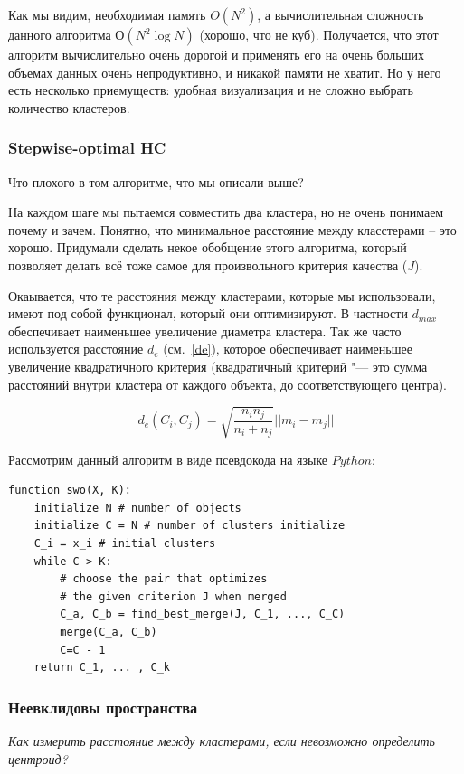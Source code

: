 Как мы видим, необходимая память $O(N^2)$, а вычислительная сложность данного алгоритма $О(N^2 \log N)$ (хорошо, что не куб). Получается, что этот алгоритм вычислительно очень дорогой и применять его на очень больших объемах данных очень непродуктивно, и никакой памяти не хватит. Но у него есть несколько приемуществ: удобная визуализация и не сложно выбрать количество кластеров.

\subsubsection{Stepwise-optimal HC}
Что плохого в том алгоритме, что мы описали выше?

На каждом шаге мы пытаемся совместить два кластера, но не очень понимаем почему и зачем. Понятно, что минимальное расстояние между класстерами -- это хорошо. Придумали сделать некое обобщение этого алгоритма, который позволяет делать всё тоже самое для произвольного критерия качества ($J$).

Окаывается, что те расстояния между кластерами, которые мы использовали, имеют под собой функционал, который они оптимизируют. В частности 
$d_{max}$ обеспечивает наименьшее увеличение диаметра кластера.
Так же часто используется расстояние
$d_e$ (см.~\ref{de}), которое обеспечивает наименьшее увеличение квадратичного критерия (квадратичный критерий "--- это сумма расстояний внутри кластера от каждого объекта, до соответствующего центра).

\begin{equation}\label{de}
d_e(C_i,C_j) = \sqrt{\frac{n_i n_j}{n_i+n_j}}||m_i - m_j||
\end{equation}

Рассмотрим данный алгоритм в виде псевдокода на языке $Python$:
\begin{lstlisting}
function swo(X, K):
    initialize N # number of objects
    initialize C = N # number of clusters initialize 
    C_i = x_i # initial clusters 
    while C > K:
        # choose the pair that optimizes
        # the given criterion J when merged
        C_a, C_b = find_best_merge(J, C_1, ..., C_C) 
        merge(C_a, C_b)
        C=C - 1
    return C_1, ... , C_k
\end{lstlisting}

\subsubsection{Неевклидовы пространства}

{\it Как измерить расстояние между кластерами, если невозможно определить центроид?}

